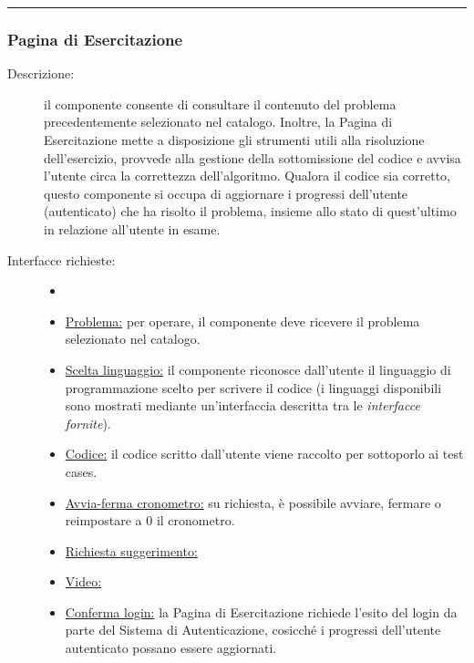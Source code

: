 \documentclass[11pt, a4paper]{article}
\theoremstyle{definition} %
\begin{document}
\begin{center}
    \rule{5cm}{1pt}
\end{center}

\subsubsection{Pagina di Esercitazione}\label{exepag}
\begin{description}
    \item[Descrizione:] il componente consente di consultare il contenuto del problema
    precedentemente selezionato nel catalogo. Inoltre, la Pagina di Esercitazione mette
    a disposizione gli strumenti utili alla risoluzione dell'esercizio, provvede alla
    gestione della sottomissione del codice e avvisa l'utente circa la correttezza dell'algoritmo.
    Qualora il codice sia corretto, questo componente si occupa di aggiornare i progressi
    dell'utente (autenticato) che ha risolto il problema, insieme allo stato di quest'ultimo
    in relazione all'utente in esame.

    \item[Interfacce richieste:]
    \begin{itemize}
        \item[]

        \item \underline{Problema:} per operare, il componente deve ricevere il problema
        selezionato nel catalogo.

        \item \underline{Scelta linguaggio:} il componente riconosce dall'utente il
        linguaggio di programmazione scelto per scrivere il codice (i linguaggi disponibili
        sono mostrati mediante un'interfaccia descritta tra le \textit{interfacce fornite}).

        \item \underline{Codice:} il codice scritto dall'utente viene raccolto
        per sottoporlo ai test cases.

        \item \underline{Avvia-ferma cronometro:} su richiesta, è possibile avviare, fermare o
        reimpostare a 0 il cronometro.

        \item \underline{Richiesta suggerimento:}
    
        \item \underline{Video:}

        \item \underline{Conferma login:} la Pagina di Esercitazione richiede l'esito
        del login da parte del Sistema di Autenticazione, cosicché i progressi dell'utente
        autenticato possano essere aggiornati.
    \end{itemize}


\end{description}
\end{document}
